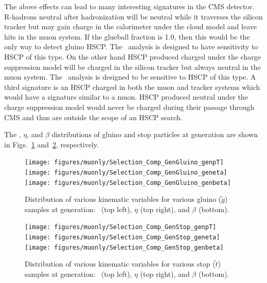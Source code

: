 The above effects can lead to many interesting signatures in the CMS detector. R-hadrons neutral after hadronization will be neutral while it traverses the silicon tracker
but may gain charge in the calorimeter under the cloud model and leave hits in the muon system. If the glueball fraction is 1.0, then this would
be the only way to detect gluino HSCP. The \muononly\ analysis is designed to have sensitivity to HSCP of this type. On the other hand HSCP produced charged under
the charge suppression model will be charged in the silicon tracker but always neutral in the muon system. The \tkonly\ analysis is designed to be sensitive
to HSCP of this type. A third signature is an HSCP charged in both the muon and tracker systems which would have a signature similar to a muon.
HSCP produced neutral under the charge suppression model would never be charged during their passage through CMS and thus are outside the scope
of an HSCP search.%

The \pt, $\eta$, and $\beta$ distributions of gluino and stop particles at generation are shown in Figs.~\ref{fig:GenGluino} and~\ref{fig:GenStop}, respectively.

\begin{figure}
 \begin{center}
  \texttt{[image: figures/muonly/Selection\_Comp\_GenGluino\_genpT]}
  \texttt{[image: figures/muonly/Selection\_Comp\_GenGluino\_geneta]}
  \texttt{[image: figures/muonly/Selection\_Comp\_GenGluino\_genbeta]}
 \end{center}
 \caption[Distribution of \pt, $\eta$, and $\beta$ for various gluino samples at generation]
{Distribution of various kinematic variables for various gluino ($\tilde{g}$) samples at generation:
\pt\ (top left), $\eta$ (top right), and $\beta$ (bottom).
   \label{fig:GenGluino}}
\end{figure}

\begin{figure}
 \begin{center}
  \texttt{[image: figures/muonly/Selection\_Comp\_GenStop\_genpT]}
  \texttt{[image: figures/muonly/Selection\_Comp\_GenStop\_geneta]}
  \texttt{[image: figures/muonly/Selection\_Comp\_GenStop\_genbeta]}
 \end{center}
 \caption[Distribution of \pt, $\eta$, and $\beta$ for various stop samples at generation]
{Distribution of various kinematic variables for various stop ($\tilde{t}$) samples at generation:
\pt\ (top left), $\eta$ (top right), and $\beta$ (bottom).
   \label{fig:GenStop}}
\end{figure}

